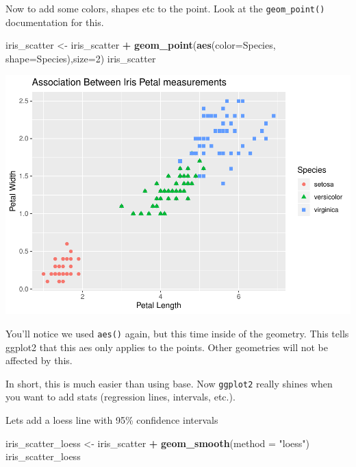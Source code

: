 \documentclass[]{article}
\newenvironment{Shaded}{\begin{snugshade}}{\end{snugshade}}
\newcommand{\DataTypeTok}[1]{\textcolor[rgb]{0.13,0.29,0.53}{#1}}
\newcommand{\DecValTok}[1]{\textcolor[rgb]{0.00,0.00,0.81}{#1}}
\newcommand{\KeywordTok}[1]{\textcolor[rgb]{0.13,0.29,0.53}{\textbf{#1}}}
\newcommand{\NormalTok}[1]{#1}
\newcommand{\OperatorTok}[1]{\textcolor[rgb]{0.81,0.36,0.00}{\textbf{#1}}}
\newcommand{\StringTok}[1]{\textcolor[rgb]{0.31,0.60,0.02}{#1}}
\begin{document}
Now to add some colors, shapes etc to the point. Look at the
\texttt{geom\_point()} documentation for this.

\begin{Shaded}
\begin{Highlighting}[]
\NormalTok{iris_scatter <-}\StringTok{  }\NormalTok{iris_scatter }\OperatorTok{+}
\StringTok{  }\KeywordTok{geom_point}\NormalTok{(}\KeywordTok{aes}\NormalTok{(}\DataTypeTok{color=}\NormalTok{Species, }\DataTypeTok{shape=}\NormalTok{Species),}\DataTypeTok{size=}\DecValTok{2}\NormalTok{)}
\NormalTok{iris_scatter}
\end{Highlighting}
\end{Shaded}

\includegraphics{figures/unnamed-chunk-6-1.pdf}

You'll notice we used \texttt{aes()} again, but this time inside of the
geometry. This tells ggplot2 that this aes only applies to the points.
Other geometries will not be affected by this.

In short, this is much easier than using base. Now \texttt{ggplot2}
really shines when you want to add stats (regression lines, intervals,
etc.).

Lets add a loess line with 95\% confidence intervals

\begin{Shaded}
\begin{Highlighting}[]
\NormalTok{iris_scatter_loess <-}\StringTok{ }\NormalTok{iris_scatter }\OperatorTok{+}
\StringTok{  }\KeywordTok{geom_smooth}\NormalTok{(}\DataTypeTok{method =} \StringTok{"loess"}\NormalTok{)}
\NormalTok{iris_scatter_loess}
\end{Highlighting}
\end{Shaded}
\end{document}
